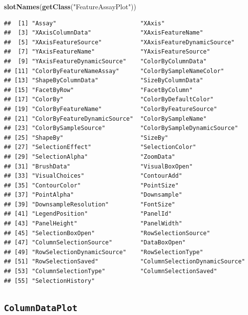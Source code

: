 \documentclass[
]{book}
\newenvironment{Shaded}{\begin{snugshade}}{\end{snugshade}}
\newcommand{\KeywordTok}[1]{\textcolor[rgb]{0.13,0.29,0.53}{\textbf{#1}}}
\newcommand{\NormalTok}[1]{#1}
\newcommand{\StringTok}[1]{\textcolor[rgb]{0.31,0.60,0.02}{#1}}
\begin{document}
\begin{Shaded}
\begin{Highlighting}[]
\KeywordTok{slotNames}\NormalTok{(}\KeywordTok{getClass}\NormalTok{(}\StringTok{"FeatureAssayPlot"}\NormalTok{))}
\end{Highlighting}
\end{Shaded}

\begin{verbatim}
##  [1] "Assay"                        "XAxis"                       
##  [3] "XAxisColumnData"              "XAxisFeatureName"            
##  [5] "XAxisFeatureSource"           "XAxisFeatureDynamicSource"   
##  [7] "YAxisFeatureName"             "YAxisFeatureSource"          
##  [9] "YAxisFeatureDynamicSource"    "ColorByColumnData"           
## [11] "ColorByFeatureNameAssay"      "ColorBySampleNameColor"      
## [13] "ShapeByColumnData"            "SizeByColumnData"            
## [15] "FacetByRow"                   "FacetByColumn"               
## [17] "ColorBy"                      "ColorByDefaultColor"         
## [19] "ColorByFeatureName"           "ColorByFeatureSource"        
## [21] "ColorByFeatureDynamicSource"  "ColorBySampleName"           
## [23] "ColorBySampleSource"          "ColorBySampleDynamicSource"  
## [25] "ShapeBy"                      "SizeBy"                      
## [27] "SelectionEffect"              "SelectionColor"              
## [29] "SelectionAlpha"               "ZoomData"                    
## [31] "BrushData"                    "VisualBoxOpen"               
## [33] "VisualChoices"                "ContourAdd"                  
## [35] "ContourColor"                 "PointSize"                   
## [37] "PointAlpha"                   "Downsample"                  
## [39] "DownsampleResolution"         "FontSize"                    
## [41] "LegendPosition"               "PanelId"                     
## [43] "PanelHeight"                  "PanelWidth"                  
## [45] "SelectionBoxOpen"             "RowSelectionSource"          
## [47] "ColumnSelectionSource"        "DataBoxOpen"                 
## [49] "RowSelectionDynamicSource"    "RowSelectionType"            
## [51] "RowSelectionSaved"            "ColumnSelectionDynamicSource"
## [53] "ColumnSelectionType"          "ColumnSelectionSaved"        
## [55] "SelectionHistory"
\end{verbatim}

\hypertarget{columndataplot}{%
\subsection{\texorpdfstring{\texttt{ColumnDataPlot}}{ColumnDataPlot}}\label{columndataplot}}
\end{document}
